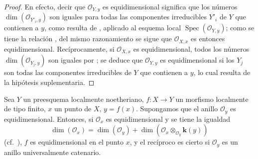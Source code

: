 \begin{proof}
En efecto, decir que $\mathcal O_{Y,y}$ es equidimensional significa que los números $\dim(\mathcal O_{Y'_i,y})$ son iguales para todas las componentes irreducibles $Y'_i$ de $Y$ que contienen a $y$, como resulta de , aplicado al esquema local $\operatorname{Spec}(\mathcal O_{Y,y})$; como se tiene la relación , del mismo razonamiento se sigue que $\mathcal O_{X,x}$ es entonces equidimensional.
Recíprocamente, si $\mathcal O_{X,x}$ es equidimensional, todos los números $\dim(\mathcal O_{Y_j,y})$ son iguales por ; se deduce que $\mathcal O_{Y,y}$ es equidimensional si los $Y_j$ son todas las componentes irreducibles de $Y$ que contienen a $y$, lo cual resulta de la hipótesis suplementaria.
\end{proof}

\begin{proposition}[13.3.6]
\label{IV.13.3.6}
Sea $Y$ un preesquema localmente noetheriano, $f:X\to Y$ un morfismo localmente de tipo finito, $x$ un punto de $X$, $y=f(x)$.
Supongamos que el anillo $\mathcal O_y$ es equidimensional. Entonces, si $\mathcal O_x$ es equidimensional y se tiene la igualdad
\[
\tag{13.3.6.1}
\label{IV.13.3.6.1-fr}
  \dim(\mathcal O_x)=\dim(\mathcal O_y)
  +\dim(\mathcal O_x\otimes_{\mathcal O_y}\boldsymbol{k}(y))
\]
\textup{(cf.\ )}, $f$ es equidimensional en el punto $x$, y el recíproco es cierto si $\mathcal O_y$ es un anillo universalmente catenario.
\end{proposition}

